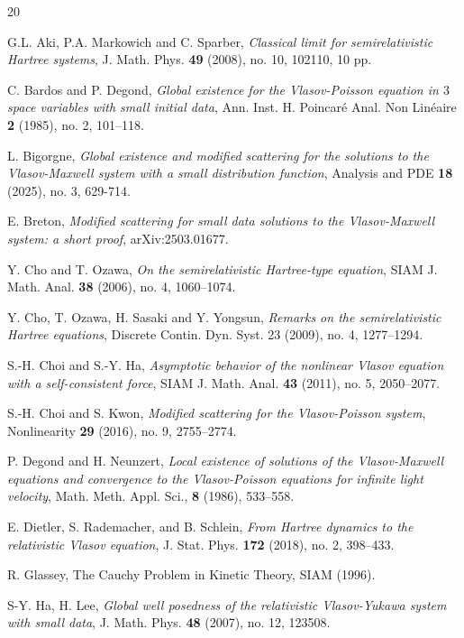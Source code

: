 \documentclass[reqno, 11pt, letterpaper]{amsart}
\theoremstyle{remark}
\numberwithin{equation}{section}
\numberwithin{theorem}{section}
\numberwithin{table}{section}
\numberwithin{figure}{section}
\begin{document}
\begin{thebibliography}{20}

G.L. Aki, P.A. Markowich and C. Sparber, \emph{Classical limit for semirelativistic Hartree systems}, J. Math. Phys. \textbf{49} (2008), no. 10, 102110, 10 pp.

 C. Bardos and P. Degond, \emph{Global existence for the {V}lasov-{P}oisson equation in {$3$} space variables with small initial data}, Ann. Inst. H. Poincar\'e Anal. Non Lin\'eaire \textbf{2} (1985), no. 2, 101--118.

 L. Bigorgne, \emph{Global existence and modified scattering for the solutions to the {V}lasov-{M}axwell system with a small distribution function}, 
Analysis and PDE \textbf{18}  (2025), no. 3, 629-714.

 E. Breton, \emph{Modified scattering for small data solutions to the Vlasov-Maxwell system: a short proof}, arXiv:2503.01677.


 Y. Cho and T. Ozawa, \emph{On the semirelativistic Hartree-type equation}, SIAM J. Math. Anal. \textbf{38} (2006), no. 4, 1060--1074.

 Y. Cho, T. Ozawa, H. Sasaki and Y. Yongsun, \emph{Remarks on the semirelativistic Hartree equations}, Discrete Contin. Dyn. Syst. 23 (2009), no. 4, 1277--1294.

 S.-H. Choi and S.-Y. Ha, 
\emph{Asymptotic behavior of the nonlinear Vlasov equation with a self-consistent force}, SIAM J. Math. Anal. \textbf{43} (2011), no. 5, 2050--2077.


 S.-H. Choi and S. Kwon, \emph{Modified scattering for the Vlasov-Poisson system}, Nonlinearity \textbf{29} (2016), no. 9, 2755--2774.

 P. Degond and H. Neunzert, \emph{Local existence of solutions of the Vlasov-Maxwell equations and convergence to the Vlasov-Poisson equations for infinite light velocity}, Math. Meth. Appl. Sci., \textbf{8} (1986), 533--558. 

E. Dietler, S. Rademacher, and B. Schlein, 
\emph{From Hartree dynamics to the relativistic Vlasov equation}, J. Stat. Phys. \textbf{172} (2018), no. 2, 398--433.

 R. Glassey, The Cauchy Problem in Kinetic Theory, SIAM (1996).

 S-Y. Ha, H. Lee, \emph{Global well posedness of the relativistic Vlasov-Yukawa system with small data}, J. Math. Phys. \textbf{48} (2007), no. 12, 123508.


\end{thebibliography}
\end{document}
